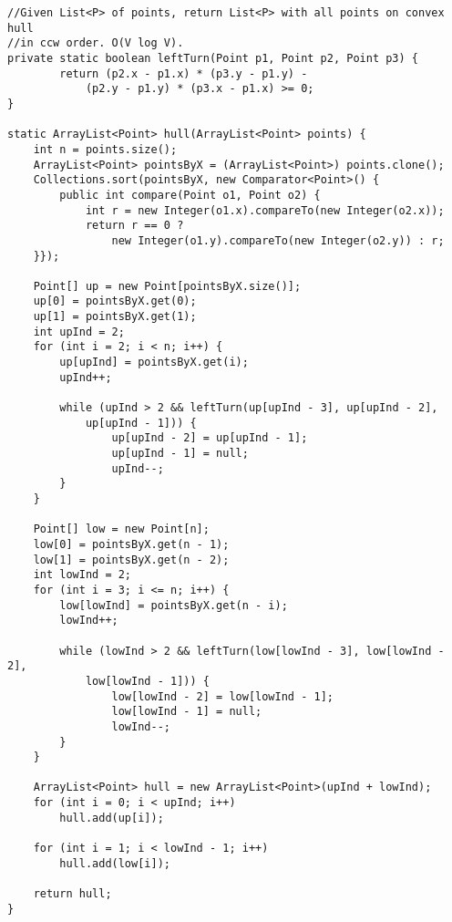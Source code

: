 \begin{verbatim}
//Given List<P> of points, return List<P> with all points on convex hull
//in ccw order. O(V log V).
private static boolean leftTurn(Point p1, Point p2, Point p3) {
        return (p2.x - p1.x) * (p3.y - p1.y) -
	        (p2.y - p1.y) * (p3.x - p1.x) >= 0;
}

static ArrayList<Point> hull(ArrayList<Point> points) {
    int n = points.size();
    ArrayList<Point> pointsByX = (ArrayList<Point>) points.clone();
    Collections.sort(pointsByX, new Comparator<Point>() {
        public int compare(Point o1, Point o2) {
            int r = new Integer(o1.x).compareTo(new Integer(o2.x));
            return r == 0 ?
	            new Integer(o1.y).compareTo(new Integer(o2.y)) : r;
    }});

    Point[] up = new Point[pointsByX.size()];
    up[0] = pointsByX.get(0);
    up[1] = pointsByX.get(1);
    int upInd = 2;
    for (int i = 2; i < n; i++) {
        up[upInd] = pointsByX.get(i);
        upInd++;

        while (upInd > 2 && leftTurn(up[upInd - 3], up[upInd - 2],
	        up[upInd - 1])) {
	            up[upInd - 2] = up[upInd - 1];
	            up[upInd - 1] = null;
	            upInd--;
        }
    }

    Point[] low = new Point[n];
    low[0] = pointsByX.get(n - 1);
    low[1] = pointsByX.get(n - 2);
    int lowInd = 2;
    for (int i = 3; i <= n; i++) {
        low[lowInd] = pointsByX.get(n - i);
        lowInd++;

        while (lowInd > 2 && leftTurn(low[lowInd - 3], low[lowInd - 2],
	        low[lowInd - 1])) {
	            low[lowInd - 2] = low[lowInd - 1];
	            low[lowInd - 1] = null;
	            lowInd--;
        }
    }

    ArrayList<Point> hull = new ArrayList<Point>(upInd + lowInd);
    for (int i = 0; i < upInd; i++)
        hull.add(up[i]);

    for (int i = 1; i < lowInd - 1; i++) 
        hull.add(low[i]);

    return hull;
}
\end{verbatim}